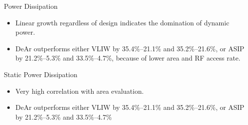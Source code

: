 \documentclass{beamer}
\begin{document}
\begin{CJK}{UTF8}{bkai}
            \begin{frame}{Power Dissipation}
                \setcounter{subfigure}{0}
                \begin{figure}[t]
                    \begin{center}
                    \end{center}
                \end{figure}
                \begin{itemize}
                    \item <2->{Linear growth regardless of design indicates the domination of dynamic power.}
                    \item <3->{DeAr outperforms either VLIW by 35.4\%--21.1\% and 35.2\%--21.6\%, 
                            or ASIP by 21.2\%--5.3\% and 33.5\%--4.7\%, because of lower area and RF access rate.}
                \end{itemize}
            \end{frame}

            \begin{frame}{Static Power Dissipation}
                \setcounter{subfigure}{0}
                \begin{figure}[t]
                    \begin{center}
                    \end{center}
                \end{figure}
                \begin{itemize}
                    \item <2->{Very high correlation with area evaluation.}
                    \item <3->{DeAr outperforms either VLIW by 35.4\%--21.1\% and 35.2\%--21.6\%, or ASIP by 21.2\%--5.3\% and 33.5\%--4.7\%}
                \end{itemize}
            \end{frame}


\end{CJK}
\end{document}
